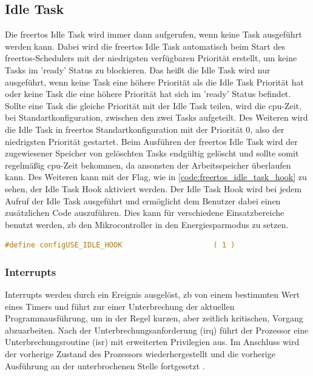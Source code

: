 \documentclass[../EDF Master Thesis.tex]{subfiles}
\begin{document}
\subsection{Idle Task} \label{section:idle_task}
Die \ac{freertos} Idle Task wird immer dann aufgerufen, wenn keine Task ausgeführt werden kann.
Dabei wird die \ac{freertos} Idle Task automatisch beim Start des \ac{freertos}-Schedulers mit der niedrigsten verfügbaren Priorität erstellt, um keine Tasks im 'ready' Status zu blockieren.
Das heißt die Idle Task wird nur ausgeführt, wenn keine Task eine höhere Priorität als die Idle Task Priorität hat oder keine Task die eine höhere Priorität hat sich im 'ready' Status befindet.
Sollte eine Task die gleiche Priorität mit der Idle Task teilen, wird die \ac{cpu}-Zeit, bei Standartkonfiguration, zwischen den zwei Tasks aufgeteilt.
Des Weiteren wird die Idle Task in \ac{freertos} Standartkonfiguration mit der Priorität 0, also der niedrigsten Priorität gestartet.
Beim Ausführen der \ac{freertos} Idle Task wird der zugewiesener Speicher von gelöschten Tasks endgültig gelöscht und sollte somit regelmäßig \ac{cpu}-Zeit bekommen, da ansonsten der Arbeitsspeicher überlaufen kann.
Des Weiteren kann mit der Flag, wie in \autoref{code:freertos_idle_task_hook} zu sehen, der Idle Task Hook aktiviert werden.
Der Idle Task Hook wird bei jedem Aufruf der Idle Task ausgeführt und ermöglicht dem Benutzer dabei einen zusätzlichen Code auszuführen.
Dies kann für verschiedene Einsatzbereiche benutzt werden, \ac{zb} den Mikrocontroller in den Energiesparmodus zu setzen.

\begin{lstlisting}[language=C, caption=FreeRTOS Idle Task Hook, label=code:freertos_idle_task_hook]
    #define configUSE_IDLE_HOOK                     ( 1 )
\end{lstlisting}


\subsubsection{Interrupts} \label{section:interrupts}
Interrupts werden durch ein Ereignis ausgelöst, \ac{zb} von einem bestimmten Wert eines Timers und führt zur einer Unterbrechung der aktuellen Programmausführung, um in der Regel kurzen, aber zeitlich kritischen, Vorgang abzuarbeiten.
Nach der Unterbrechungsanforderung (\ac{irq}) führt der Prozessor eine Unterbrechungsroutine (\ac{isr}) mit erweiterten Privilegien aus.
Im Anschluss wird der vorherige Zustand des Prozessors wiederhergestellt und die vorherige Ausführung an der unterbrochenen Stelle fortgesetzt \parencite{wiki:008}.
\end{document}
